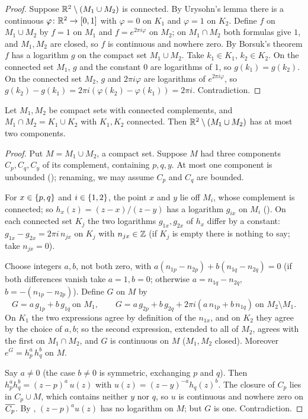 \begin{proof}
Suppose $\mathbb{R}^2\setminus(M_1\cup M_2)$ is connected. By Urysohn's lemma there is a continuous
$\varphi\colon\mathbb{R}^2\to[0,1]$ with $\varphi=0$ on $K_1$ and $\varphi=1$ on $K_2$. Define $f$ on $M_1\cup
M_2$ by $f=1$ on $M_1$ and $f=e^{2\pi i\varphi}$ on $M_2$; on $M_1\cap M_2$ both formulas give $1$, and
$M_1,M_2$ are closed, so $f$ is continuous and nowhere zero. By Borsuk's theorem $f$ has a logarithm
$g$ on the compact set $M_1\cup M_2$. Take $k_1\in K_1$, $k_2\in K_2$. On the connected set $M_1$, $g$ and
the constant $0$ are logarithms of $1$, so $g(k_1)=g(k_2)$. On the connected set $M_2$, $g$ and
$2\pi i\varphi$ are logarithms of $e^{2\pi i\varphi}$, so $g(k_2)-g(k_1)=2\pi i(\varphi(k_2)-\varphi(k_1))=2\pi
i$. Contradiction.
\end{proof}


\begin{proposition}\label{prop:mullikin-three}
Let $M_1,M_2$ be compact sets with connected complements, and $M_1\cap M_2=K_1\cup K_2$ with $K_1,K_2$
connected. Then $\mathbb{R}^2\setminus(M_1\cup M_2)$ has at most two components.
\end{proposition}

\begin{proof}
Put $M=M_1\cup M_2$, a compact set. Suppose $M$ had three components $C_p,C_q,C_y$ of its complement,
containing $p,q,y$. At most one component is unbounded (); renaming, we may assume
$C_p$ and $C_q$ are bounded.

For $x\in\left\{ p,q \right\}$ and $i\in\left\{ 1,2 \right\}$, the point $x$ and $y$ lie off $M_i$, whose complement is
connected; so $h_x(z)=(z-x)/(z-y)$ has a logarithm $g_{ix}$ on $M_i$ (). On each
connected set $K_j$ the two logarithms $g_{1x},g_{2x}$ of $h_x$ differ by a constant: $g_{1x}-g_{2x}=2\pi
i\,n_{jx}$ on $K_j$ with $n_{jx}\in\mathbb{Z}$ (if $K_j$ is empty there is nothing to say; take $n_{jx}=0$).

Choose integers $a,b$, not both zero, with $a(n_{1p}-n_{2p})+b(n_{1q}-n_{2q})=0$ (if both differences
vanish take $a=1,b=0$; otherwise $a=n_{1q}-n_{2q}$, $b=-(n_{1p}-n_{2p})$). Define $G$ on $M$ by
\[
G=a\,g_{1p}+b\,g_{1q}\ \text{on }M_1,\qquad G=a\,g_{2p}+b\,g_{2q}+2\pi i(a\,n_{1p}+b\,n_{1q})\ \text{on }M_2\setminus M_1.
\]
On $K_1$ the two expressions agree by definition of the $n_{1x}$, and on $K_2$ they agree by the choice
of $a,b$; so the second expression, extended to all of $M_2$, agrees with the first on $M_1\cap M_2$,
and $G$ is continuous on $M$ ($M_1,M_2$ closed). Moreover $e^{G}=h_p^a\,h_q^b$ on $M$.

Say $a\neq0$ (the case $b\ne0$ is symmetric, exchanging $p$ and $q$). Then
$h_p^ah_q^b=(z-p)^a\,u(z)$ with $u(z)=(z-y)^{-a}h_q(z)^b$. The closure of $C_p$ lies in $C_p\cup M$,
which contains neither $y$ nor $q$, so $u$ is continuous and nowhere zero on $\overline{C_p}$. By
, $(z-p)^au(z)$ has no logarithm on $M$; but $G$ is one. Contradiction.
\end{proof}

